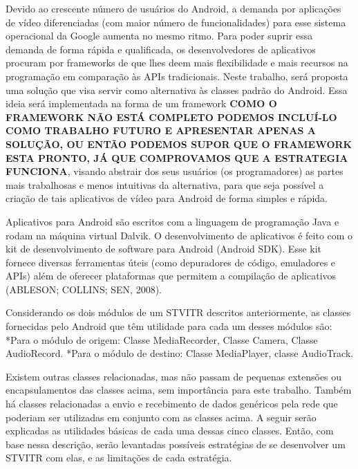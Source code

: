 \documentclass{acm_proc_article-sp}
\newcommand{\todo}[1]{\textcolor[rgb]{1.00,0.00,0.00}{\bf \uppercase{#1}}}
\begin{document}
Devido ao crescente número de usuários do Android, a demanda por aplicações de vídeo diferenciadas (com maior número de funcionalidades) para esse sistema operacional da Google aumenta no mesmo ritmo. Para poder suprir essa demanda de forma rápida e qualificada, os desenvolvedores de aplicativos procuram por  frameworks de que lhes deem mais flexibilidade e mais recursos na programação em comparação às APIs tradicionais. Neste trabalho, será proposta uma solução que visa servir como alternativa às classes padrão do Android. Essa ideia será implementada na forma de um framework \todo{como o framework não está completo podemos incluí-lo como trabalho futuro e apresentar apenas a solução, ou então podemos supor que o framework esta pronto, já que comprovamos que a estrategia funciona}, visando abstrair dos seus usuários (os programadores) as partes mais trabalhosas e menos intuitivas da alternativa, para que seja possível a criação de tais aplicativos de vídeo para Android de forma simples e rápida.

Aplicativos para Android são escritos com a linguagem de programação Java e rodam na máquina virtual Dalvik. O desenvolvimento de aplicativos é feito com o kit de desenvolvimento de software para Android (Android SDK). Esse kit fornece diversas ferramentas úteis (como depuradores de código, emuladores e APIs) além de oferecer plataformas que permitem a compilação de aplicativos (ABLESON; COLLINS; SEN, 2008).

Considerando os dois módulos de um STVITR descritos anteriormente, as classes fornecidas pelo Android que têm utilidade para cada um desses módulos são:
*Para o módulo de origem: Classe MediaRecorder, Classe Camera, Classe AudioRecord.
*Para o módulo de destino: Classe MediaPlayer, classe AudioTrack.

Existem outras classes relacionadas, mas não passam de pequenas extensões ou encapsulamentos das classes acima, sem importância para este trabalho. Também há classes relacionadas a envio e recebimento de dados genéricos pela rede que poderiam ser utilizadas em conjunto com as classes acima. A seguir serão explicadas as utilidades básicas de cada uma dessas cinco classes. Então, com base nessa descrição, serão levantadas possíveis estratégias de se desenvolver um STVITR com elas, e as limitações de cada estratégia.
\end{document}
